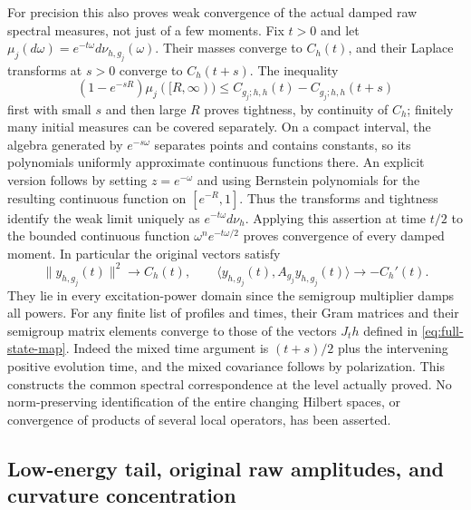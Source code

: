 For precision this also proves weak convergence of the actual
damped raw spectral measures, not just of a few moments. Fix $t>0$
and let $\mu_j(d\omega)=e^{-t\omega}d\nu_{h,g_j}(\omega)$.
Their masses converge to $C_h(t)$, and their Laplace transforms
at $s>0$ converge to $C_h(t+s)$. The inequality
\[
 (1-e^{-sR})\mu_j([R,\infty))
       \le C_{g_j;h,h}(t)-C_{g_j;h,h}(t+s)
\]
first with small $s$ and then large $R$ proves tightness, by
continuity of $C_h$; finitely many initial measures can be covered
separately. On a compact interval, the algebra generated by
$e^{-s\omega}$ separates points and contains constants, so its
polynomials uniformly approximate continuous functions there.
An explicit version follows by setting $z=e^{-\omega}$ and using
Bernstein polynomials for the resulting continuous function on
$[e^{-R},1]$. Thus the transforms and tightness identify the weak
limit uniquely as $e^{-t\omega}d\nu_h$. Applying this assertion
at time $t/2$ to the bounded continuous function
$\omega^n e^{-t\omega/2}$ proves convergence of every damped
moment. In particular the original vectors satisfy
\begin{equation}\label{eq:full-actual-norm-energy}
 \|y_{h,g_j}(t)\|^2\longrightarrow C_h(t),\qquad
 \langle y_{h,g_j}(t),A_{g_j}y_{h,g_j}(t)\rangle
       \longrightarrow -C_h'(t).
\end{equation}
They lie in every excitation-power domain since the semigroup
multiplier damps all powers. For any finite list of profiles and
times, their Gram matrices and their semigroup matrix elements
converge to those of the vectors $J_t h$ defined in
\eqref{eq:full-state-map}. Indeed the mixed time argument is
$(t+s)/2$ plus the intervening positive evolution time, and the
mixed covariance follows by polarization. This constructs the
common spectral correspondence at the level actually proved.
No norm-preserving identification of the entire changing Hilbert
spaces, or convergence of products of several local operators,
has been asserted.

\subsection{Low-energy tail, original raw amplitudes, and curvature concentration}

